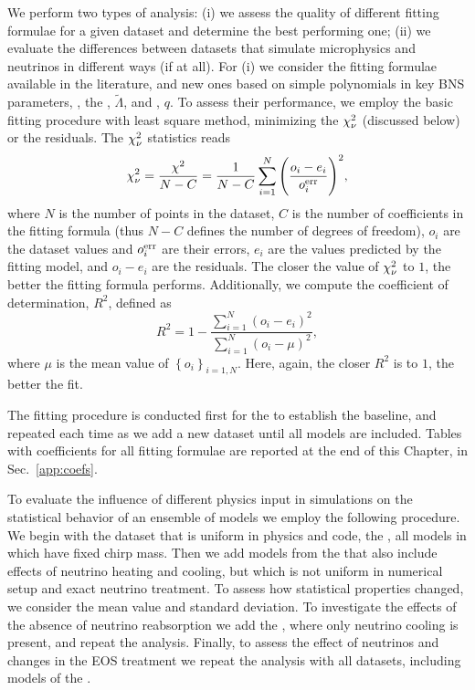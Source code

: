 We perform two types of analysis: 
(i) we assess the quality of different fitting formulae for a given
dataset and determine the best performing one; 
(ii) we evaluate the differences between datasets that 
simulate microphysics and neutrinos in different ways (if at all).
%
For (i) we consider the fitting formulae available in the literature, 
and new ones based on simple polynomials in key \ac{BNS} parameters, 
\ie, the \tildalam{}, $\tilde{\Lambda}$, and \mr{}, $q$. 
%
To assess their performance, we employ the basic fitting procedure with least
square method, minimizing the $\chi_{\nu}^2$ (discussed below) or the residuals.
The $\chi_{\nu}^2$ statistics reads
%
\begin{equation}
\chi_{\nu}^{2} = \frac{\chi^2}{N - C} = \frac{1}{N-C}\sum\limits_{i=1}^{N}\Bigg(\frac{o_i - e_i}{o_i ^{\rm err}}\Bigg)^2,
\label{eq:theory:chi2dof}
\end{equation}
%
where $N$ is the number of points in the dataset, $C$ is the number of coefficients 
in the fitting formula (thus $N-C$ defines the number of degrees of freedom),
$o_i$ are the dataset values and $o_i ^{\rm err}$ are their errors,
$e_i$ are the values predicted by the fitting model, and 
$o_i - e_i$ are the residuals.
%
The closer the value of $\chi_{\nu}^2$ to $1$, the better the fitting 
formula performs.
%
Additionally, we compute the coefficient of determination, $R^2$,
defined as 
%
\begin{equation}
R^2 = 1 - \frac{\sum\limits_{i=1}^{N}(o_i - e_i)^2}{\sum\limits_{i=1}^{N}(o_i - \mu)^2},
\end{equation}
%
where $\mu$ is the mean value of $\left\{ o_i \right\}_{i=1,N}$.
%
Here, again, the closer $R^2$ is to $1$, the better the fit. 

The fitting procedure is conducted first for the \DSrefset{} to establish
the baseline, and repeated each time as we add a new dataset until all models are included.
%
%
Tables with coefficients for all fitting formulae are reported 
at the end of this Chapter, in Sec.~\ref{app:coefs}. 

To evaluate the influence of different physics input in simulations 
on the statistical behavior of an ensemble of models we employ the 
following procedure.
%
We begin with the dataset that is uniform in physics and code, the \DSrefset{},
all models in which have fixed chirp mass.
Then we add models from the \DSheatcool{} that also include effects of neutrino 
heating and cooling, but which is not uniform in numerical setup and exact neutrino treatment.
To assess how statistical properties changed, we consider the mean value and standard deviation.
To investigate the effects of the absence of neutrino reabsorption 
we add the \DScool{},  
where only neutrino cooling is present, and repeat the analysis.
Finally, to assess the effect of neutrinos and changes in the \ac{EOS} treatment 
we repeat the analysis with all datasets, including models of the \DSnone{}.

